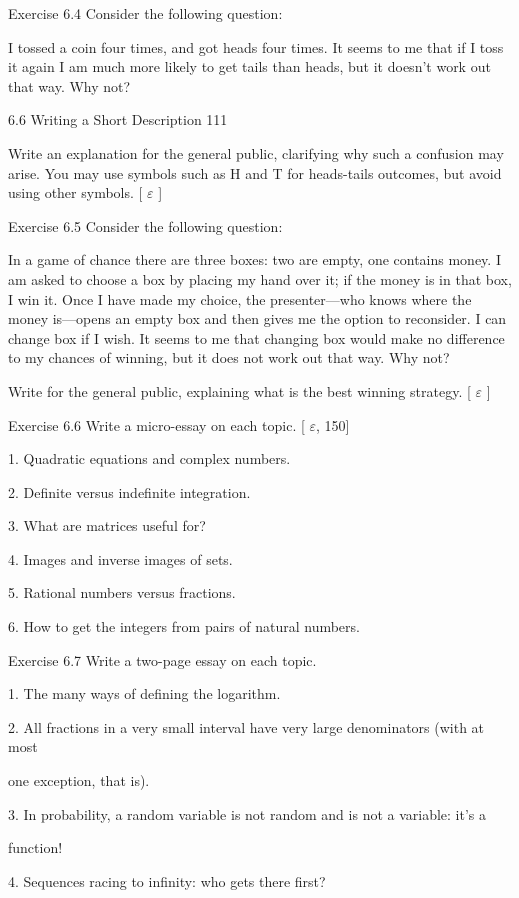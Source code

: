 \documentclass[11pt]{article}
\theoremstyle{plain}
\theoremstyle{definition}
\begin{document}
Exercise 6.4 Consider the following question:

I tossed a coin four times, and got heads four times. It seems to me that if I toss it again I am much more likely to get tails than heads, but it doesn't work out that way. Why not?

6.6 Writing a Short Description 111

Write an explanation for the general public, clarifying why such a confusion may arise. You may use symbols such as H and T for heads-tails outcomes, but avoid using other symbols. [ $\varepsilon$ ]

Exercise 6.5 Consider the following question:

In a game of chance there are three boxes: two are empty, one contains money. I am asked to choose a box by placing my hand over it; if the money is in that box, I win it. Once I have made my choice, the presenter---who knows where the money is---opens an empty box and then gives me the option to reconsider. I can change box if I wish. It seems to me that changing box would make no difference to my chances of winning, but it does not work out that way. Why not?

Write for the general public, explaining what is the best winning strategy. [ $\varepsilon$ ]

Exercise 6.6 Write a micro-essay on each topic. [ $\varepsilon$, 150]

1. Quadratic equations and complex numbers.

2. Definite versus indefinite integration.

3. What are matrices useful for?

4. Images and inverse images of sets.

5. Rational numbers versus fractions.

6. How to get the integers from pairs of natural numbers.

Exercise 6.7 Write a two-page essay on each topic.

1. The many ways of defining the logarithm.

2. All fractions in a very small interval have very large denominators (with at most

one exception, that is).

3. In probability, a random variable is not random and is not a variable: it's a

function!

4. Sequences racing to infinity: who gets there first?
\end{document}
